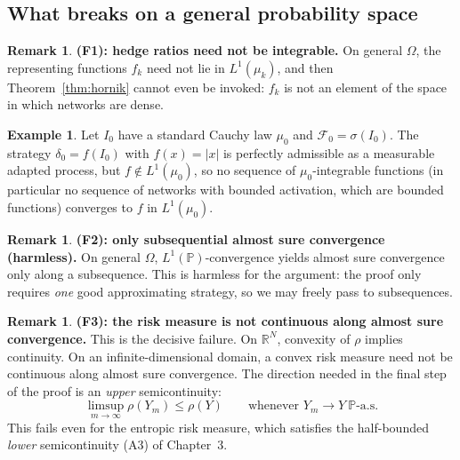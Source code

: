 \documentclass[11pt,a4paper]{report}
\numberwithin{equation}{chapter}
\theoremstyle{plain}
\theoremstyle{definition}
\newtheorem{example}[proposition]{Example}
\newtheorem{remark}[proposition]{Remark}
\newcommand{\PP}{\mathbb{P}}
\newcommand{\R}{\mathbb{R}}
\newcommand{\F}{\mathcal{F}}
\newcommand{\as}{\ \PP\text{-a.s.}}
\begin{document}
\subsection*{What breaks on a general probability space}

\begin{remark}\label{rem:F1}
  \textbf{(F1): hedge ratios need not be integrable.}
  On general $\Omega$, the representing functions $f_k$ need not lie in
  $L^1(\mu_k)$, and then Theorem~\ref{thm:hornik} cannot even be
  invoked: $f_k$ is not an element of the space in which networks are
  dense.
\end{remark}

\begin{example}\label{ex:integrability}
  Let $I_0$ have a standard Cauchy law $\mu_0$ and $\F_0=\sigma(I_0)$.
  The strategy $\delta_0=f(I_0)$ with $f(x)=|x|$ is perfectly admissible
  as a measurable adapted process, but $f\notin L^1(\mu_0)$, so no
  sequence of $\mu_0$-integrable functions (in particular no sequence
  of networks with bounded activation, which are bounded functions)
  converges to $f$ in $L^1(\mu_0)$.
\end{example}

\begin{remark}\label{rem:F2}
  \textbf{(F2): only subsequential almost sure convergence (harmless).}
  On general $\Omega$, $L^1(\PP)$-convergence yields almost sure
  convergence only along a subsequence. This is harmless for the
  argument: the proof only requires \emph{one} good approximating
  strategy, so we may freely pass to subsequences.
\end{remark}

\begin{remark}\label{rem:F3}
  \textbf{(F3): the risk measure is not continuous along almost sure
    convergence.}
  This is the decisive failure. On $\R^N$, convexity of $\rho$ implies
  continuity. On an infinite-dimensional domain, a convex risk measure
  need not be continuous along almost sure convergence. The direction
  needed in the final step of the proof is an \emph{upper}
  semicontinuity:
  \[
    \limsup_{m\to\infty}\rho(Y_m)\le\rho(Y)\qquad\text{whenever }Y_m\to Y\as
  \]
  This fails even for the entropic risk measure, which satisfies the
  half-bounded \emph{lower} semicontinuity (A3) of Chapter~3.
\end{remark}
\end{document}
